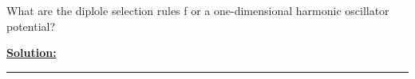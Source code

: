 \documentclass{article}
\begin{document}
What are the diplole selection rules f or a one-dimensional harmonic oscillator potential?

\vskip 0.5cm
\underline{\textbf{Solution:}} 


\vskip 0.5cm 
\hrule 
\vskip 0.5cm






\end{document}
